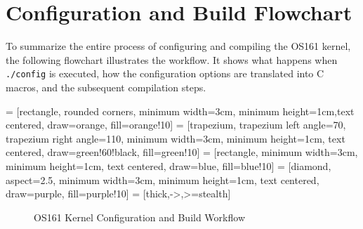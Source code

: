 \newpage

\section*{Configuration and Build Flowchart}
To summarize the entire process of configuring and compiling the OS161 kernel, the following flowchart illustrates the workflow. It shows what happens when \texttt{./config} is executed, how the configuration options are translated into C macros, and the subsequent compilation steps.

 = [rectangle, rounded corners, minimum width=3cm, minimum height=1cm,text centered, draw=orange, fill=orange!10]
 = [trapezium, trapezium left angle=70, trapezium right angle=110, minimum width=3cm, minimum height=1cm, text centered, draw=green!60!black, fill=green!10]
 = [rectangle, minimum width=3cm, minimum height=1cm, text centered, draw=blue, fill=blue!10]
 = [diamond, aspect=2.5, minimum width=3cm, minimum height=1cm, text centered, draw=purple, fill=purple!10]
 = [thick,->,>=stealth]

\begin{figure}[htbp]
\centering
{}
\caption{OS161 Kernel Configuration and Build Workflow}
\end{figure}

